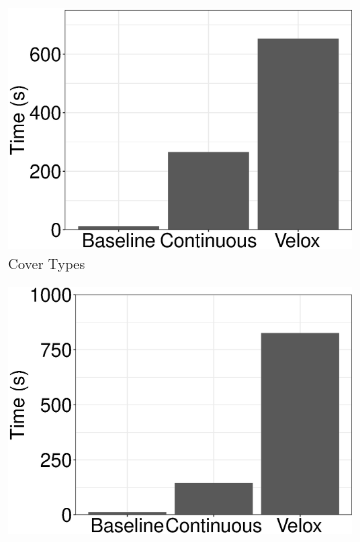 \documentclass{vldb}
\begin{document}
\begin{figure}[h]
\begin{subfigure}[b]{0.2\textwidth}
	\includegraphics[width=\linewidth, height=\linewidth,keepaspectratio]{../images/experiment-results/cover-types-times.eps}
	\caption{Cover Types}
	\label{fig:cover-types-times}
\end{subfigure}%
\begin{subfigure}[b]{0.2\textwidth}
	\includegraphics[width=\linewidth, height=\linewidth,keepaspectratio]{../images/experiment-results/sea-times.eps}

\end{subfigure}
\end{figure}
\end{document}
